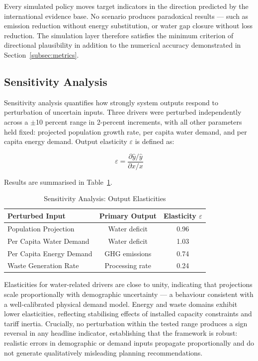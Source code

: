 \documentclass[conference]{IEEEtran}
\begin{document}
Every simulated policy moves target indicators in the direction
predicted by the international evidence base. No scenario produces
paradoxical results --- such as emission reduction without energy
substitution, or water gap closure without loss reduction. The
simulation layer therefore satisfies the minimum criterion of
directional plausibility in addition to the numerical accuracy
demonstrated in Section~\ref{subsec:metrics}.

\subsection{Sensitivity Analysis}
\label{subsec:sensitivity}

Sensitivity analysis quantifies how strongly system outputs respond to
perturbation of uncertain inputs. Three drivers were perturbed
independently across a $\pm$10 percent range in 2-percent increments,
with all other parameters held fixed: projected population growth rate,
per capita water demand, and per capita energy demand. Output elasticity
$\varepsilon$ is defined as:

\begin{equation}
\varepsilon = \frac{\partial \hat{y}/\hat{y}}{\partial x/x}
\label{eq:elasticity}
\end{equation}

Results are summarised in Table~\ref{tab:sensitivity}.

\begin{table}[htbp]
\caption{Sensitivity Analysis: Output Elasticities}
\label{tab:sensitivity}
\begin{center}
\begin{tabular}{|l|c|c|}
\hline
\textbf{Perturbed Input} & \textbf{Primary Output} &
\textbf{Elasticity $\varepsilon$} \\
\hline
Population Projection     & Water deficit     & 0.96 \\
Per Capita Water Demand   & Water deficit     & 1.03 \\
Per Capita Energy Demand  & GHG emissions     & 0.74 \\
Waste Generation Rate     & Processing rate   & 0.24 \\
\hline
\end{tabular}
\end{center}
\end{table}

Elasticities for water-related drivers are close to unity, indicating
that projections scale proportionally with demographic uncertainty --- a
behaviour consistent with a well-calibrated physical demand model.
Energy and waste domains exhibit lower elasticities, reflecting
stabilising effects of installed capacity constraints and tariff
inertia. Crucially, no perturbation within the tested range produces a
sign reversal in any headline indicator, establishing that the framework
is robust: realistic errors in demographic or demand inputs propagate
proportionally and do not generate qualitatively misleading planning
recommendations.
\end{document}
